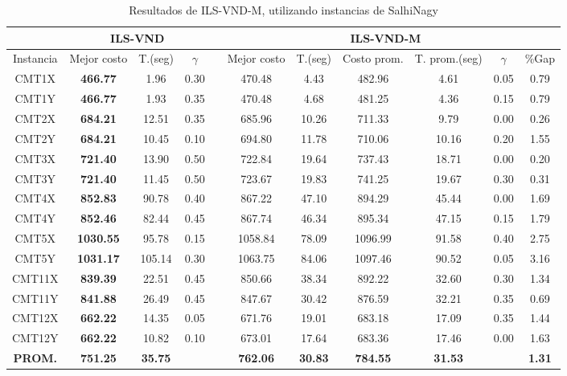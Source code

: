 \begin{table}[h]
\caption{ Resultados de ILS-VND-M, utilizando instancias de SalhiNagy}
\centering
\scriptsize
\begin{tabular*}{1.00\textwidth}{@{\extracolsep{\fill}} |c||c c c||c c c c c c c|}
\hline
 & \multicolumn{3}{c||}{\bf{ILS-VND}} & \multicolumn{7}{c|}{\bf{ILS-VND-M}}\\\hline
Instancia & Mejor costo & T.(seg) & $\gamma$ & & Mejor costo & T.(seg) & Costo prom. & T. prom.(seg) & $\gamma$ & \%Gap\\ [0.5ex]
\hline\hline
CMT1X & \bf{466.77} &  1.96 & 0.30 & & 
470.48 & 4.43 & 482.96 & 4.61 & 0.05 & 0.79\\CMT1Y & \bf{466.77} & 1.93 & 0.35 & & 
470.48 & 4.68 & 481.25 & 4.36 & 0.15 & 0.79\\CMT2X & \bf{684.21} & 12.51 & 0.35 & & 
685.96 & 10.26 & 711.33 & 9.79 & 0.00 & 0.26\\CMT2Y & \bf{684.21} & 10.45 & 0.10 & & 
694.80 & 11.78 & 710.06 & 10.16 & 0.20 & 1.55\\CMT3X & \bf{721.40} & 13.90 & 0.50 & & 
722.84 & 19.64 & 737.43 & 18.71 & 0.00 & 0.20\\CMT3Y & \bf{721.40} &  11.45 & 0.50 & & 
723.67 & 19.83 & 741.25 & 19.67 & 0.30 & 0.31\\CMT4X & \bf{852.83} & 90.78 & 0.40 & & 
867.22 & 47.10 & 894.29 & 45.44 & 0.00 & 1.69\\CMT4Y & \bf{852.46} & 82.44 & 0.45 & & 
867.74 & 46.34 & 895.34 & 47.15 & 0.15 & 1.79\\CMT5X & \bf{1030.55} & 95.78 & 0.15 & & 
1058.84 & 78.09 & 1096.99 & 91.58 & 0.40 & 2.75\\CMT5Y & \bf{1031.17} & 105.14 & 0.30 & & 
1063.75 & 84.06 & 1097.46 & 90.52 & 0.05 & 3.16\\CMT11X & \bf{839.39} &  22.51 & 0.45  & & 
850.66 & 38.34 & 892.22 & 32.60 & 0.30 & 1.34\\CMT11Y & \bf{841.88} & 26.49 & 0.45 & & 
847.67 & 30.42 & 876.59 & 32.21 & 0.35 & 0.69\\CMT12X & \bf{662.22} & 14.35 & 0.05  & & 
671.76 & 19.01 & 683.18 & 17.09 & 0.35 & 1.44\\CMT12Y & \bf{662.22} & 10.82 & 0.10 & & 
673.01 & 17.64 & 683.36 & 17.46 & 0.00 & 1.63\\\hline\hline\bf{PROM.} & 
\bf{751.25} & \bf{35.75} & \bf{} & & \bf{762.06} & \bf{30.83} & \bf{784.55} & \bf{31.53} & & \bf{1.31}\\[1ex]\hline
\end{tabular*}
\label{table:finalS-ILS}
\end{table}

